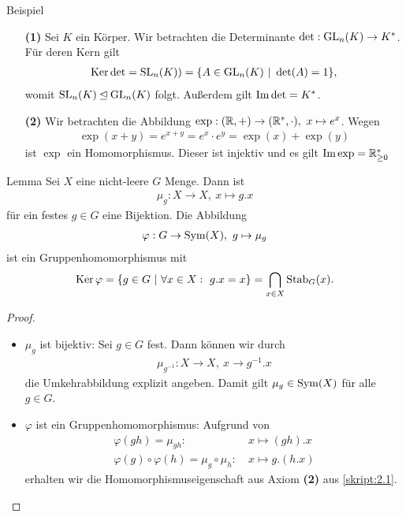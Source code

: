 \begin{genericdf}{Beispiel} \label{skript:3.7} \
	\begin{enumerate}
		\item[\textbf{(1)}]
		Sei $ K $ ein Körper. Wir betrachten die Determinante $ \det : \operatorname{GL}_n(K) \to K^\ast $. Für deren Kern gilt
		\begin{align*}
		\operatorname{Ker} \det = \operatorname{SL}_n(K))= \lbrace A \in \operatorname{GL}_n(K) \ | \ \det(A) = 1 \rbrace,
		\end{align*}
		womit $ \operatorname{SL}_n(K) \unlhd \operatorname{GL}_n(K)$ folgt. Außerdem gilt $ \operatorname{Im} \det = K^\ast $.
		\item[\textbf{(2)}] 
		Wir betrachten die Abbildung $ \exp : (\mathbb{R},+) \to (\mathbb{R}^\ast, \cdot) , \ x \mapsto e^x$. Wegen
		\begin{align*}
		\exp(x+y) = e^{x+y} = e^x \cdot e^y = \exp(x) + \exp(y)
		\end{align*}
		ist $ \exp $ ein Homomorphismus. Dieser ist injektiv und es gilt $ \operatorname{Im} \exp = \mathbb{R}^\ast_{\geq 0} $
	\end{enumerate}
\end{genericdf}

\begin{genericthm}{Lemma}\label{skript:3.8}
	Sei $ X $ eine nicht-leere $ G $ Menge. Dann ist 
	\begin{align*}
	\mu_g : X \to X, \ x \mapsto g.x
	\end{align*}
	für ein festes $ g \in G $ eine Bijektion. Die Abbildung 
	\begin{align*}
	\varphi: G \to \operatorname{Sym}(X), \ g \mapsto \mu_g
	\end{align*}
	ist ein Gruppenhomomorphismus mit 
	\begin{align*}
	\operatorname{Ker} \varphi = \lbrace g \in G \ | \ \forall x \in X: \ g.x = x \rbrace = \bigcap\limits_{x\in X} \operatorname{Stab}_G(x).
	\end{align*}
\end{genericthm}

\begin{proof}\
	\begin{itemize}
		\item $ \mu_g $ ist bijektiv: Sei $ g \in G $ fest. Dann können wir durch
		\begin{align*}
		\mu_{g^{-1}} : X \to X, \ x \to g^{-1}.x 
		\end{align*}
		die Umkehrabbildung explizit angeben. Damit gilt $ \mu_g \in \operatorname{Sym}(X) $ für alle $ g \in G $.
		\item $ \varphi $ ist ein Gruppenhomomorphismus: Aufgrund von
		\begin{align*}
		\varphi(gh) = \mu_{gh}: \ &x \mapsto (gh).x \\
		\varphi(g) \circ \varphi(h) = \mu_g \circ \mu_h : \  &x \mapsto g.(h.x)
		\end{align*}
		erhalten wir die Homomorphismuseigenschaft aus Axiom \textbf{(2)} aus \ref{skript:2.1}.
	\end{itemize}
\end{proof}

